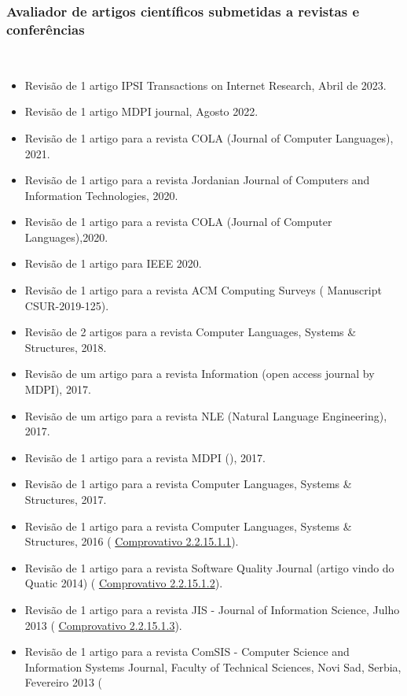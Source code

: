 \documentclass[11pt]{article}
\begin{document}
\subsubsection{Avaliador de artigos científicos submetidas a revistas e conferências}
 \\

\begin{itemize}
\item{Revisão de 1 artigo IPSI Transactions on Internet Research, Abril de 2023.}
\item{Revisão de 1 artigo MDPI journal, Agosto 2022.}
\item{Revisão de 1 artigo para a revista COLA (Journal of Computer Languages), 2021.}
\item{Revisão de 1 artigo para a revista Jordanian Journal of Computers and Information Technologies, 2020.}
\item{Revisão de 1 artigo para a revista COLA (Journal of Computer Languages),2020.}
\item{Revisão de 1 artigo para IEEE 2020.}
\item{Revisão de 1 artigo para a revista ACM Computing Surveys ( Manuscript CSUR-2019-125).}
\item{Revisão de 2 artigos para a revista Computer Languages, Systems 
\& Structures, 2018.}
\item{Revisão de um artigo para a revista Information (open access journal by MDPI), 2017.}
\item{Revisão de um artigo para a revista NLE (Natural Language Engineering), 2017.}
\item{Revisão de 1 artigo para a revista MDPI (), 2017.}
\item{Revisão de 1 artigo para a revista Computer Languages, Systems 
\& Structures, 2017.}
\item{Revisão de 1 artigo para a revista Computer Languages, Systems 
\& Structures, 2016 (
\href{run:ComprovativosCOCP/revisoes/ComLang2016.pdf}{Comprovativo 2.2.15.1.1}). }
\item{Revisão de 1 artigo para a revista Software Quality Journal (artigo vindo do Quatic 2014) (
\href{run:ComprovativosCOCP/revisoes/SQJ2014.pdf}{Comprovativo 2.2.15.1.2}).}
\item{Revisão de 1 artigo para a revista JIS - Journal of Information Science, Julho 2013 (
\href{run:ComprovativosCOCP/revisoes/JIS2013.pdf}{Comprovativo 2.2.15.1.3}).}
\item{Revisão de 1 artigo para a revista ComSIS - Computer Science and Information Systems Journal, Faculty of Technical Sciences, Novi Sad, Serbia, Fevereiro 2013 (
}
\end{itemize}
\end{document}
